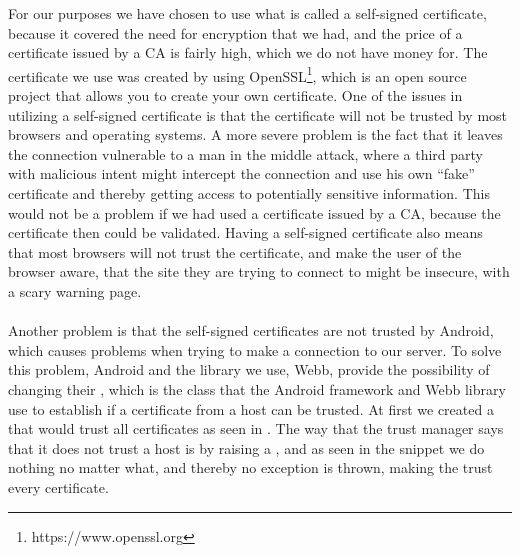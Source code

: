 For our purposes we have chosen to use what is called a self-signed certificate, because it covered the need for encryption that we had, and the price of a certificate issued by a CA is fairly high, which we do not have money for. The certificate we use was created by using OpenSSL\footnote{https://www.openssl.org}, which is an open source project that allows you to create your own certificate. One of the issues in utilizing a self-signed certificate is that the certificate will not be trusted by most browsers and operating systems. A more severe problem is the fact that it leaves the connection vulnerable to a man in the middle attack, where a third party with malicious intent might intercept the connection and use his own ``fake'' certificate and thereby getting access to potentially sensitive information. This would not be a problem if we had used a certificate issued by a CA, because the certificate then could be validated. Having a self-signed certificate also means that most browsers will not trust the certificate, and make the user of the browser aware, that the site they are trying to connect to might be insecure, with a scary warning page. 
\\\\
Another problem is that the self-signed certificates are not trusted by Android, which causes problems when trying to make a connection to our server. To solve this problem, Android and the library we use, Webb, provide the possibility of changing their , which is the class that the Android framework and Webb library use to establish if a certificate from a host can be trusted. At first we created a  that would trust all certificates as seen in . The way that the trust manager says that it does not trust a host is by raising a , and as seen in the snippet we do nothing no matter what, and thereby no exception is thrown, making the  trust every certificate. 


\FloatBarrier

